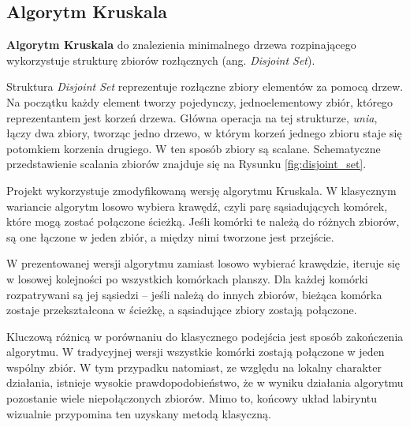 \subsection{Algorytm Kruskala}

\textbf{Algorytm Kruskala} \cite{cormen2009} do znalezienia minimalnego drzewa rozpinającego wykorzystuje strukturę zbiorów rozłącznych (ang. \textit{Disjoint Set}).

Struktura \textit{Disjoint Set} reprezentuje rozłączne zbiory elementów za pomocą drzew. Na początku każdy element tworzy pojedynczy, jednoelementowy zbiór, którego reprezentantem jest korzeń drzewa. Główna operacja na tej strukturze, \textit{unia}, łączy dwa zbiory, tworząc jedno drzewo, w którym korzeń jednego zbioru staje się potomkiem korzenia drugiego. W ten sposób zbiory są scalane. Schematyczne przedstawienie scalania zbiorów znajduje się na Rysunku \ref{fig:disjoint_set}.



Projekt wykorzystuje zmodyfikowaną wersję algorytmu Kruskala. W klasycznym wariancie algorytm losowo wybiera krawędź, czyli parę sąsiadujących komórek, które mogą zostać połączone ścieżką. Jeśli komórki te należą do różnych zbiorów, są one łączone w jeden zbiór, a między nimi tworzone jest przejście.

W prezentowanej wersji algorytmu zamiast losowo wybierać krawędzie, iteruje się w losowej kolejności po wszystkich komórkach planszy. Dla każdej komórki rozpatrywani są jej sąsiedzi – jeśli należą do innych zbiorów, bieżąca komórka zostaje przekształcona w ścieżkę, a sąsiadujące zbiory zostają połączone.

Kluczową różnicą w porównaniu do klasycznego podejścia jest sposób zakończenia algorytmu. W tradycyjnej wersji wszystkie komórki zostają połączone w jeden wspólny zbiór. W tym przypadku natomiast, ze względu na lokalny charakter działania, istnieje wysokie prawdopodobieństwo, że w wyniku działania algorytmu pozostanie wiele niepołączonych zbiorów. Mimo to, końcowy układ labiryntu wizualnie przypomina ten uzyskany metodą klasyczną.

